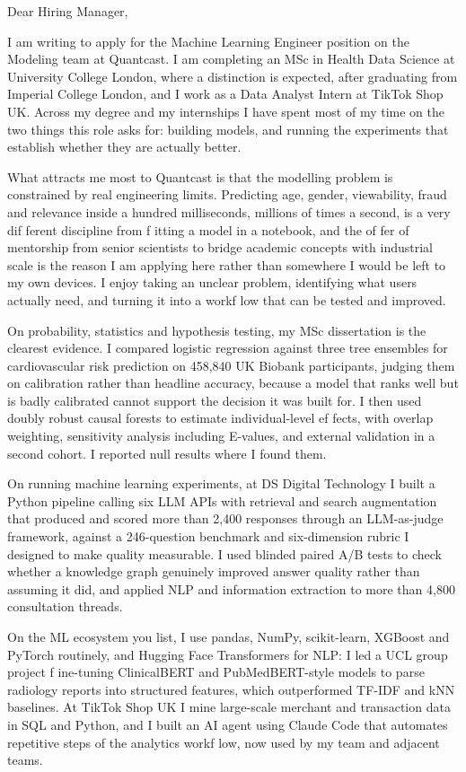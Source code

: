 \documentclass[letterpaper,11pt]{article}
\begin{document}
Dear Hiring Manager,

I am writing to apply for the Machine Learning Engineer position on the Modeling team at Quantcast. I am completing an MSc in Health Data Science at University College London, where a distinction is expected, after graduating from Imperial College London, and I work as a Data Analyst Intern at TikTok Shop UK. Across my degree and my internships I have spent most of my time on the two things this role asks for: building models, and running the experiments that establish whether they are actually better.

What attracts me most to Quantcast is that the modelling problem is constrained by real engineering limits. Predicting age, gender, viewability, fraud and relevance inside a hundred milliseconds, millions of times a second, is a very dif\kern0pt ferent discipline from f\kern0pt itting a model in a notebook, and the of\kern0pt fer of mentorship from senior scientists to bridge academic concepts with industrial scale is the reason I am applying here rather than somewhere I would be left to my own devices. I enjoy taking an unclear problem, identifying what users actually need, and turning it into a workf\kern0pt low that can be tested and improved.

On probability, statistics and hypothesis testing, my MSc dissertation is the clearest evidence. I compared logistic regression against three tree ensembles for cardiovascular risk prediction on 458,840 UK Biobank participants, judging them on calibration rather than headline accuracy, because a model that ranks well but is badly calibrated cannot support the decision it was built for. I then used doubly robust causal forests to estimate individual-level ef\kern0pt fects, with overlap weighting, sensitivity analysis including E-values, and external validation in a second cohort. I reported null results where I found them.

On running machine learning experiments, at DS Digital Technology I built a Python pipeline calling six LLM APIs with retrieval and search augmentation that produced and scored more than 2,400 responses through an LLM-as-judge framework, against a 246-question benchmark and six-dimension rubric I designed to make quality measurable. I used blinded paired A/B tests to check whether a knowledge graph genuinely improved answer quality rather than assuming it did, and applied NLP and information extraction to more than 4,800 consultation threads.

On the ML ecosystem you list, I use pandas, NumPy, scikit-learn, XGBoost and PyTorch routinely, and Hugging Face Transformers for NLP: I led a UCL group project f\kern0pt ine-tuning ClinicalBERT and PubMedBERT-style models to parse radiology reports into structured features, which outperformed TF-IDF and kNN baselines. At TikTok Shop UK I mine large-scale merchant and transaction data in SQL and Python, and I built an AI agent using Claude Code that automates repetitive steps of the analytics workf\kern0pt low, now used by my team and adjacent teams.
\end{document}
